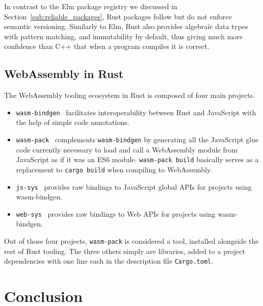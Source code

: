 In contrast to the Elm package registry we discussed in Section~\ref{sub:reliable_packages},
Rust packages follow but do not enforce semantic versioning.
Similarly to Elm, Rust also provides algebraic data types with pattern matching,
and immutability by default, thus giving much more confidence than C++
that when a program compiles it is correct.

\subsection{WebAssembly in Rust}%
\label{sub:wasm_in_rust}

The WebAssembly tooling ecosystem in Rust is composed of four main projects.
\begin{itemize}
	\item \verb|wasm-bindgen|~\cite{wasmbindgen} facilitates interoperability
		between Rust and JavaScript with the help of simple code annotations.
	\item \verb|wasm-pack|~\cite{wasmpack} complements \verb|wasm-bindgen|
		by generating all the JavaScript glue code currently necessary to load and call
		a WebAssembly module from JavaScript as if it was an ES6 module.
		\verb|wasm-pack build| basically serves as a replacement to
		\verb|cargo build| when compiling to WebAssembly.
	\item \verb|js-sys|~\cite{jssys} provides raw bindings to JavaScript global APIs
		for projects using wasm-bindgen.
	\item \verb|web-sys|~\cite{websys} provides raw bindings to Web APIs
		for projects using wasm-bindgen.
\end{itemize}

Out of those four projects, \verb|wasm-pack| is considered a tool,
installed alongside the rest of Rust tooling.
The three others simply are libraries, added to a project dependencies
with one line each in the description file \verb|Cargo.toml|.

\section{Conclusion}%
\label{sec:cclwasm}

